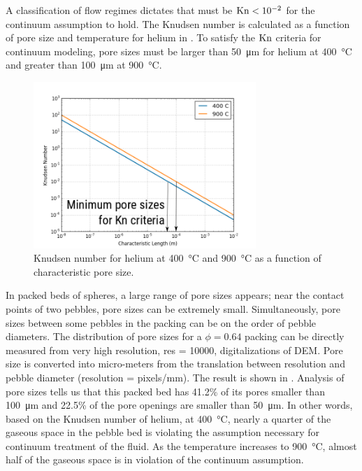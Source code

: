 A classification of flow regimes dictates that must be $\mathrm{Kn} < 10^{-2}$ for the continuum assumption to hold.\cite{karniadakis2006microflows} The Knudsen number is calculated as a function of pore size and temperature for helium in . To satisfy the $\mathrm{Kn}$ criteria for continuum modeling, pore sizes must be larger than \SI{50}{\micro\meter} for helium at \SI{400}{\celsius} and greater than \SI{100}{\micro\meter} at \SI{900}{\celsius}.

\begin{figure}[ht]
    \centering
    \includegraphics[width=0.75\textwidth]{figures/lbm/Knudsen_limits}
    \caption{Knudsen number for helium at \SI{400}{\celsius} and \SI{900}{\celsius} as a function of characteristic pore size.}\label{fig:Knudsen_limits}
\end{figure}

 In packed beds of spheres, a large range of pore sizes appears; near the contact points of two pebbles, pore sizes can be extremely small. Simultaneously, pore sizes between some pebbles in the packing can be on the order of pebble diameters. The distribution of pore sizes for a $\phi = 0.64$ packing can be directly measured from very high resolution, res = \num{10000}, digitalizations of DEM. Pore size is converted into micro-meters from the translation between resolution and pebble diameter (resolution = pixels/mm). The result is shown in . Analysis of pore sizes tells us that this packed bed has 41.2\% of its pores smaller than \SI{100}{\micro\meter} and 22.5\% of the pore openings are smaller than \SI{50}{\micro\meter}. In other words, based on the Knudsen number of helium, at \SI{400}{\celsius}, nearly a quarter of the gaseous space in the pebble bed is violating the assumption necessary for continuum treatment of the fluid. As the temperature increases to \SI{900}{\celsius}, almost half of the gaseous space is in violation of the continuum assumption. 

